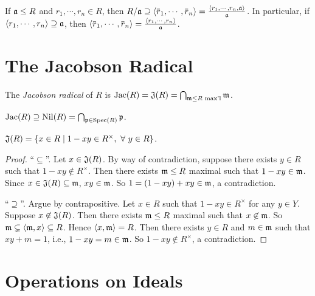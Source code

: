 \begin{fact*}
    If $\mathfrak{a} \leq R$ and $r_1,\cdots,r_n \in R$, then $R/\ffa \supseteq \langle \overbar r_1,\cdots,\overbar r_n \rangle = \frac{\langle r_1,\cdots,r_n, \ffa \rangle}{\ffa}$. In particular, if $\langle r_1,\cdots,r_n \rangle \supseteq \mathfrak{a}$, then $\langle \overbar r_1, \cdots, \overbar r_n \rangle = \frac{\langle r_1,\cdots,r_n \rangle}{\ffa}$.
\end{fact*}

\section*{The Jacobson Radical}

\begin{definition}
    The \emph{Jacobson radical} of $R$ is $\operatorname{Jac}(R) = \mathfrak{J}(R) = \bigcap_{\mathfrak{m} \leq R \text{ max'l}}\mathfrak{m}$.
\end{definition}

\begin{fact}
    $\operatorname{Jac}(R) \supseteq \operatorname{Nil}(R) = \bigcap_{\mathfrak{p} \in \operatorname{Spec}(R)}\mathfrak{p}$.
\end{fact}

\begin{proposition}
    $\mathfrak{J}(R) = \{x \in R \mid 1-xy \in R^\times, \ \forall \  y \in R\}$.
\end{proposition}

\begin{proof}
    ``$\subseteq$''. Let $x \in \mathfrak{J}(R)$. By way of contradiction, suppose there exists $y \in R$ such that $1-xy \not \in R^\times$. Then there exists $\mathfrak{m} \leq R$ maximal such that $1-xy \in \mathfrak{m}$. Since $x \in \mathfrak{J}(R) \subseteq \mathfrak{m}$, $xy \in \mathfrak{m}$. So $1 = (1-xy) + xy \in \mathfrak{m}$, a contradiction. \par
    ``$\supseteq$''. Argue by contrapositive. Let $x \in R$ such that $1-xy \in R^\times$ for any $y \in Y$. Suppose $x \not \in \mathfrak{J}(R)$. Then there exists $\mathfrak{m} \leq R$ maximal such that $x \not \in \mathfrak{m}$. So $\mathfrak{m} \subsetneq \langle \mathfrak{m}, x \rangle \subseteq R$. Hence $\langle x,\mathfrak{m} \rangle = R$. Then there exists $y \in R$ and $m \in \mathfrak{m}$ such that $xy+m = 1$, i.e., $1-xy = m \in \mathfrak{m}$. So $1-xy \not \in R^\times$, a contradiction.
\end{proof}

\section*{Operations on Ideals}

